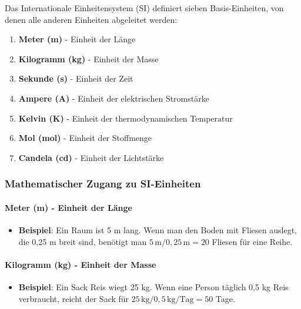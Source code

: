 \documentclass{vorlage-design-main}
\begin{document}
Das Internationale Einheitensystem (SI) definiert sieben
Basis-Einheiten, von denen alle anderen Einheiten abgeleitet werden:

\begin{enumerate}
\def\labelenumi{\arabic{enumi}.}

\item
  \textbf{Meter (m)} - Einheit der Länge
\item
  \textbf{Kilogramm (kg)} - Einheit der Masse
\item
  \textbf{Sekunde (s)} - Einheit der Zeit
\item
  \textbf{Ampere (A)} - Einheit der elektrischen Stromstärke
\item
  \textbf{Kelvin (K)} - Einheit der thermodynamischen Temperatur
\item
  \textbf{Mol (mol)} - Einheit der Stoffmenge
\item
  \textbf{Candela (cd)} - Einheit der Lichtstärke
\end{enumerate}

\hypertarget{mathematischer-zugang-zu-si-einheiten}{%
\subsubsection{Mathematischer Zugang zu
SI-Einheiten}\label{mathematischer-zugang-zu-si-einheiten}}

\hypertarget{meter-m---einheit-der-luxe4nge}{%
\paragraph{Meter (m) - Einheit der
Länge}\label{meter-m---einheit-der-laenge}}

\begin{itemize}

\item
  \textbf{Beispiel}: Ein Raum ist 5 m lang. Wenn man den Boden mit
  Fliesen auslegt, die 0,25 m breit sind, benötigt man
  $5 \, \text{m} / 0,25 \, \text{m} = 20$ Fliesen für eine Reihe.
\end{itemize}

\hypertarget{kilogramm-kg---einheit-der-masse}{%
\paragraph{Kilogramm (kg) - Einheit der
Masse}\label{kilogramm-kg---einheit-der-masse}}

\begin{itemize}

\item
  \textbf{Beispiel}: Ein Sack Reis wiegt 25 kg. Wenn eine Person täglich
  0,5 kg Reis verbraucht, reicht der Sack für
  $25 \, \text{kg} / 0,5 \, \text{kg/Tag} = 50$ Tage.
\end{itemize}
\end{document}
